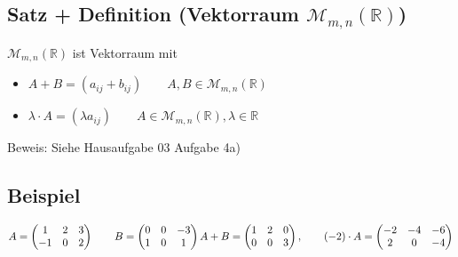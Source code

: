 \documentclass[a4paper, 12pt,titlepage, pdf, headsepline]{article}
\newcommand{\R}{\mathds{R}}
\newcommand{\M}{\mathcal{M}}
\renewcommand{\>}{\rightarrow}
\renewcommand{\*}{\cdot}
\begin{document}
\subsection{Satz + Definition (Vektorraum $\M_{m,n}(\R)$)}
$\mathcal{M}_{m,n}(\R)$ ist Vektorraum mit 
\begin{itemize}
	\item $A + B = (a_{ij} + b_{ij}) \qquad A,B \in \mathcal{M}_{m,n}(\R)$
	\item $\lambda \cdot A = (\lambda a_{ij})\qquad A \in \mathcal{M}_{m,n}(\R), \lambda \in \R$
\end{itemize}
Beweis: Siehe Hausaufgabe 03 Aufgabe 4a)
\subsection{Beispiel}
$A = \begin{pmatrix}
1 & 2 & 3 \\
-1 & 0 & 2 \\
\end{pmatrix}\qquad B = \begin{pmatrix}
0& 0& -3 \\
1&0&1 \\
\end{pmatrix} \\
A + B = \begin{pmatrix}
1 & 2 & 0 \\
0 & 0 & 3 \\
\end{pmatrix}, \qquad (-2) \cdot A = \begin{pmatrix}
-2 & -4 & -6 \\
2 & 0 & -4 \\
\end{pmatrix}$
\end{document}
